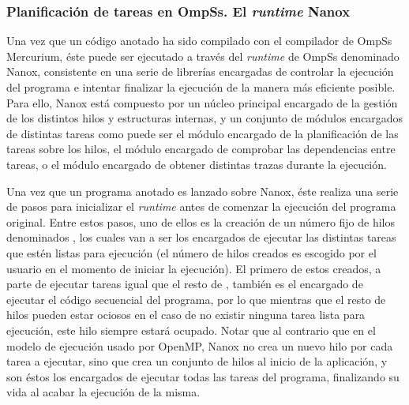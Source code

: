 \subsubsection{Planificación de tareas en OmpSs. El \emph{runtime} Nanox}

Una vez que un código anotado ha sido compilado con el compilador de OmpSs
Mercurium, éste puede ser ejecutado a través del \emph{runtime} de OmpSs
denominado Nanox, consistente en una serie de librerías encargadas de
controlar la ejecución del programa e intentar finalizar la ejecución de la
manera más eficiente posible. Para ello, Nanox está compuesto por un núcleo
principal encargado de la gestión de los distintos hilos y estructuras
internas, y un conjunto de módulos encargados de distintas tareas como
puede ser el módulo encargado de la planificación de las tareas sobre los
hilos, el módulo encargado de comprobar las dependencias entre tareas, o el
módulo encargado de obtener distintas trazas durante la ejecución.

Una vez que un programa anotado es lanzado sobre Nanox, éste realiza una
serie de pasos para inicializar el \emph{runtime} antes de comenzar la
ejecución del programa original. Entre estos pasos, uno de ellos es la
creación de un número fijo de hilos denominados \wts, los cuales van a ser
los encargados de ejecutar las distintas tareas que estén listas para
ejecución (el número de hilos creados es escogido por el usuario en el
momento de iniciar la ejecución). El primero de estos \wts creados, a parte
de ejecutar tareas igual que el resto de \wts, también es el encargado de
ejecutar el código secuencial del programa, por lo que mientras que el
resto de hilos pueden estar ociosos en el caso de no existir ninguna tarea
lista para ejecución, este hilo siempre estará ocupado. Notar que al
contrario que en el modelo de ejecución usado por OpenMP, Nanox no crea un
nuevo hilo por cada tarea a ejecutar, sino que crea un conjunto de hilos al
inicio de la aplicación, y son éstos los encargados de ejecutar todas las
tareas del programa, finalizando su vida al acabar la ejecución de la misma.

